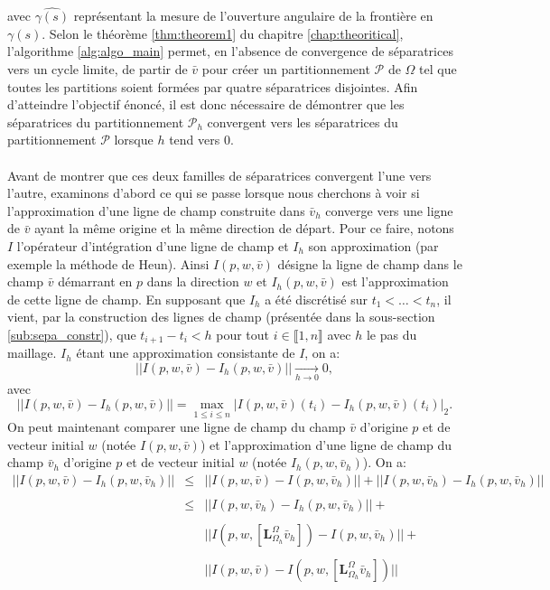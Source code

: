 avec $\widehat{\gamma(s)}$ représentant la mesure de l'ouverture angulaire de la frontière en $\gamma(s)$. Selon le théorème \ref{thm:theorem1} du chapitre \ref{chap:theoritical}, l'algorithme \ref{alg:algo_main} permet, en l'absence de convergence de séparatrices vers un cycle limite, de partir de $\bar{v}$ pour créer un partitionnement $\mathcal{P}$ de $\Omega$ tel que toutes les partitions soient formées par quatre séparatrices disjointes. Afin d'atteindre l'objectif énoncé, il est donc nécessaire de démontrer que les séparatrices du partitionnement $\mathcal{P}_h$ convergent vers les séparatrices du partitionnement $\mathcal{P}$ lorsque $h$ tend vers $0$.\\\\
Avant de montrer que ces deux familles de séparatrices convergent l'une vers l'autre, examinons d'abord ce qui se passe lorsque nous cherchons à voir si l'approximation d'une ligne de champ construite dans $\bar{v}_h$ converge vers une ligne de $\bar{v}$ ayant la même origine et la même direction de départ. Pour ce faire, notons $I$ l'opérateur d'intégration d'une ligne de champ et $I_h$ son approximation (par exemple la méthode de Heun). Ainsi $I(p,w,\bar{v})$ désigne la ligne de champ dans le champ $\bar{v}$ démarrant en $p$ dans la direction $w$ et $I_h(p,w,\bar{v})$ est l'approximation de cette ligne de champ. En supposant que $I_h$ a été discrétisé sur $t_1<\dots<t_n$, il vient, par la construction des lignes de champ (présentée dans la sous-section \ref{sub:sepa_constr}), que $t_{i+1}-t_i<h$ pour tout $i\in\llbracket 1, n\rrbracket$ avec $h$ le pas du maillage. $I_h$ étant une approximation consistante de $I$, on a:
$$||I(p,w,\bar{v})-I_h(p,w,\bar{v})||\xrightarrow[h \to 0]{} 0,$$
avec $$||I(p,w,\bar{v})-I_h(p,w,\bar{v})||=\max_{1 \leq i \leq n} |I(p,w,\bar{v})(t_i)-I_h(p,w,\bar{v})(t_i)|_2.$$
On peut maintenant comparer une ligne de champ du champ $\bar{v}$ d'origine $p$ et de vecteur initial $w$ (notée $I(p,w,\bar{v})$) et l'approximation d'une ligne de champ du champ $\bar{v}_h$ d'origine $p$ et de vecteur initial $w$ (notée $I_h(p,w,\bar{v}_h)$). On a:
\begin{eqnarray*}
||I(p,w,\bar{v})-I_h(p,w,\bar{v}_h)||&\leq& ||I(p,w,\bar{v})-I(p,w,\bar{v}_h)|| + ||I(p,w,\bar{v}_h)-I_h(p,w,\bar{v}_h)||\\\\
&\leq& ||I(p,w,\bar{v}_h)-I_h(p,w,\bar{v}_h)|| +\\\\
&&||I(p,w,[\mathbf{L}_{\Omega_h}^{\Omega}\bar{v}_h])-I(p,w,\bar{v}_h)||+\\\\
&&||I(p,w,\bar{v})-I(p,w,[\mathbf{L}_{\Omega_h}^{\Omega}\bar{v}_h])||
\end{eqnarray*}
